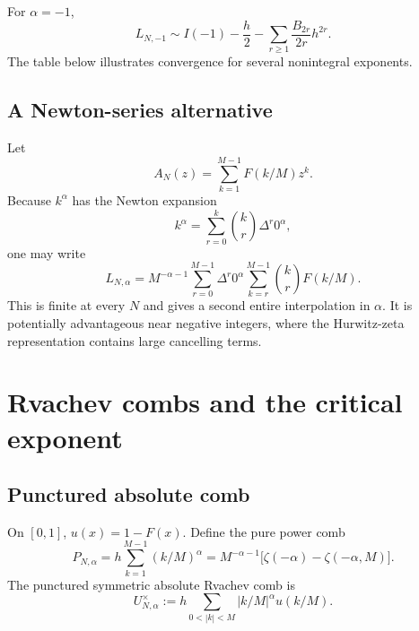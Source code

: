 \documentclass[11pt,oneside]{article}
\numberwithin{equation}{section}
\theoremstyle{definition}
\theoremstyle{remark}
\begin{document}
For \(\alpha=-1\),
\begin{equation}
 L_{N,-1}\sim I(-1)-\frac h2-
 \sum_{r\ge1}\frac{B_{2r}}{2r}h^{2r}.
 \label{eq:alpha-minus-one}
\end{equation}
The table below illustrates convergence for several nonintegral exponents.

\begin{table}[H]
\centering
\small
\resizebox{0.96\textwidth}{!}{}
\caption{Direct complex-power combs and a six-term reversed Euler--Maclaurin estimate.
The last column is numerical evidence, not an independent closed-form evaluation.}
\label{tab:fractional-values}
\end{table}

\subsection{A Newton-series alternative}

Let
\begin{equation}
 A_N(z)=\sum_{k=1}^{M-1}F(k/M)z^k.
\end{equation}
Because \(k^\alpha\) has the Newton expansion
\begin{equation}
 k^\alpha=\sum_{r=0}^{k}\binom{k}{r}\Delta^r0^\alpha,
 \label{eq:Newton-power}
\end{equation}
one may write
\begin{equation}
 L_{N,\alpha}=M^{-\alpha-1}
 \sum_{r=0}^{M-1}\Delta^r0^\alpha
 \sum_{k=r}^{M-1}\binom krF(k/M).
 \label{eq:Newton-comb}
\end{equation}
This is finite at every \(N\) and gives a second entire interpolation in \(\alpha\).  It
is potentially advantageous near negative integers, where the Hurwitz-zeta representation
contains large cancelling terms.

\section{Rvachev combs and the critical exponent}
\label{sec:up}

\subsection{Punctured absolute comb}

On \([0,1]\), \(u(x)=1-F(x)\).  Define the pure power comb
\begin{equation}
 P_{N,\alpha}
 =h\sum_{k=1}^{M-1}(k/M)^\alpha
 =M^{-\alpha-1}\bigl[\zeta(-\alpha)-\zeta(-\alpha,M)\bigr].
 \label{eq:pure-comb}
\end{equation}
The punctured symmetric absolute Rvachev comb is
\begin{equation}
 U_{N,\alpha}^{\times}
 :=h\sum_{0<|k|<M}|k/M|^\alpha u(k/M).
 \label{eq:U-punctured}
\end{equation}
\end{document}

